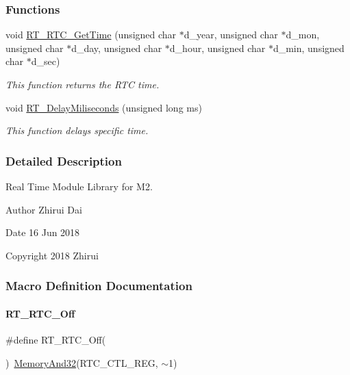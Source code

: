 \subsubsection*{Functions}
\begin{DoxyCompactItemize}
\item 
void \mbox{\hyperlink{a00053_ae30dec10f77cab56a66ee070fbe6a490}{R\+T\+\_\+\+R\+T\+C\+\_\+\+Get\+Time}} (unsigned char $\ast$d\+\_\+year, unsigned char $\ast$d\+\_\+mon, unsigned char $\ast$d\+\_\+day, unsigned char $\ast$d\+\_\+hour, unsigned char $\ast$d\+\_\+min, unsigned char $\ast$d\+\_\+sec)
\begin{DoxyCompactList}\small\item\em This function returns the R\+TC time. \end{DoxyCompactList}\item 
void \mbox{\hyperlink{a00053_a960534919351d6e419e70a78521e87da}{R\+T\+\_\+\+Delay\+Miliseconds}} (unsigned long ms)
\begin{DoxyCompactList}\small\item\em This function delays specific time. \end{DoxyCompactList}\end{DoxyCompactItemize}


\subsubsection{Detailed Description}
Real Time Module Library for M2. 

\begin{DoxyAuthor}{Author}
Zhirui Dai 
\end{DoxyAuthor}
\begin{DoxyDate}{Date}
16 Jun 2018 
\end{DoxyDate}
\begin{DoxyCopyright}{Copyright}
2018 Zhirui 
\end{DoxyCopyright}


\subsubsection{Macro Definition Documentation}
\mbox{\label{a00053_ad065bdfa3138a773950a7d5e9e9f863a}} 
\paragraph{\texorpdfstring{R\+T\+\_\+\+R\+T\+C\+\_\+\+Off}{RT\_RTC\_Off}}
{\footnotesize\ttfamily \#define R\+T\+\_\+\+R\+T\+C\+\_\+\+Off(\begin{DoxyParamCaption}{ }\end{DoxyParamCaption})~\mbox{\hyperlink{a00020_a5c1a2bd4c1bd4c2f429d8042a45327ff}{Memory\+And32}}(R\+T\+C\+\_\+\+C\+T\+L\+\_\+\+R\+EG, $\sim$1)}



